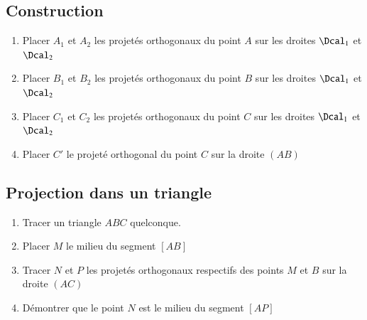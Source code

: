 \documentclass[oneside,12pt]{article}          %
\begin{document}
\subsection{Construction} 
\begin{minipage}{0.55\linewidth} \restoreskip
	\begin{enumerate} \setlength{\itemsep}{1mm}
		\item Placer $A_1$ et $A_2$ les projetés orthogonaux du point $A$ sur les droites $\Dcal_1$ et $\Dcal_2$
		\item Placer $B_1$ et $B_2$ les projetés orthogonaux du point $B$ sur les droites $\Dcal_1$ et $\Dcal_2$
		\item Placer $C_1$ et $C_2$ les projetés orthogonaux du point $C$ sur les droites $\Dcal_1$ et $\Dcal_2$
		\item Placer $C'$ le projeté orthogonal du point $C$ sur la droite $(AB)$
	\end{enumerate}
\end{minipage} \hspace{5mm} 
\begin{minipage}{0.35\linewidth} \vspace{-15mm}
\end{minipage}



\subsection{Projection dans un triangle}
\begin{enumerate}
	\item Tracer un triangle $ABC$ quelconque.
	\item Placer $M$ le milieu du segment $[AB]$
	\item Tracer $N$ et $P$ les projetés orthogonaux respectifs des points $M$ et $B$ sur la droite $(AC)$
	\item Démontrer que le point $N$  est le milieu du segment $[AP]$
\end{enumerate}
\end{document}
